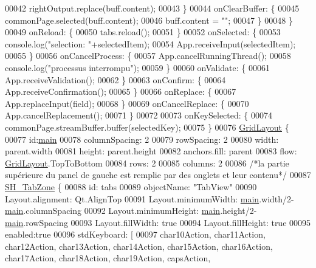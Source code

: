 \begin{DoxyCode}
00042             rightOutput.replace(buff.content);
00043         \}
00044         onClearBuffer: \{
00045             commonPage.selected(buff.content);
00046             buff.content = \textcolor{stringliteral}{""};
00047         \}
00048     \}
00049     onReload: \{
00050         tabs.reload();
00051     \}
00052     onSelected: \{
00053         console.log(\textcolor{stringliteral}{"selection: "}+selectedItem);
00054         App.receiveInput(selectedItem);
00055     \}
00056     onCancelProcess: \{
00057         App.cancelRunningThread();
00058         console.log(\textcolor{stringliteral}{"processus interrompu"});
00059     \}
00060     onValidate: \{
00061         App.receiveValidation();
00062     \}
00063     onConfirm: \{
00064         App.receiveConfirmation();
00065     \}
00066     onReplace: \{
00067         App.replaceInput(field);
00068     \}
00069     onCancelReplace: \{
00070         App.cancelReplacement();
00071     \}
00072 
00073     onKeySelected: \{
00074         commonPage.streamBuffer.buffer(selectedKey);
00075     \}
00076     \hyperlink{classGridLayout}{GridLayout} \{
00077         \textcolor{keywordtype}{id}:\hyperlink{main_8cpp_a3c04138a5bfe5d72780bb7e82a18e627}{main}
00078         columnSpacing: 2
00079         rowSpacing: 2
00080         width: parent.width
00081         height: parent.height
00082         anchors.fill: parent
00083         flow: \hyperlink{classGridLayout}{GridLayout}.TopToBottom
00084         rows: 2
00085         columns: 2
00086         \textcolor{comment}{/*la partie supérieure du panel de gauche est remplie par des onglets et leur contenu*/}
00087         \hyperlink{classSH__TabZone}{SH\_TabZone} \{
00088             \textcolor{keywordtype}{id}: tabs
00089             objectName: \textcolor{stringliteral}{"TabView"}
00090             Layout.alignment: Qt.AlignTop
00091             Layout.minimumWidth: \hyperlink{main_8cpp_a3c04138a5bfe5d72780bb7e82a18e627}{main}.width/2-\hyperlink{main_8cpp_a3c04138a5bfe5d72780bb7e82a18e627}{main}.columnSpacing
00092             Layout.minimumHeight: \hyperlink{main_8cpp_a3c04138a5bfe5d72780bb7e82a18e627}{main}.height/2-\hyperlink{main_8cpp_a3c04138a5bfe5d72780bb7e82a18e627}{main}.rowSpacing
00093             Layout.fillWidth: \textcolor{keyword}{true}
00094             Layout.fillHeight: \textcolor{keyword}{true}
00095             enabled:\textcolor{keyword}{true}
00096             stdKeyboard: [
00097                 char10Action, char11Action, char12Action, char13Action, char14Action, char15Action, 
      char16Action, char17Action, char18Action, char19Action, capsAction,

\end{DoxyCode}
